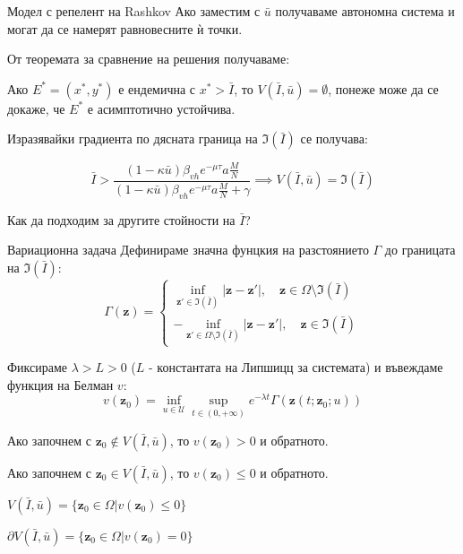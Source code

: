 \begin{frame}[t]{Модел с репелент на Rashkov}
  Ако заместим с $\bar{u}$ получаваме автономна система и могат да се намерят равновесните ѝ точки.

  От теоремата за сравнение на решения получаваме:
  \begin{proposition}
    Ако $E^* = (x^*, y^*)$ е ендемична с $x^* > \bar{I}$, то $V(\bar{I}, \bar{u}) = \emptyset$, понеже може да се докаже, че $E^*$ е асимптотично устойчива.
  \end{proposition}

  Изразявайки градиента по дясната граница на $\mathfrak{I}(\bar{I})$ се получава:
  \begin{proposition}
    \begin{equation*}
      \bar{I} > \frac{(1-\kappa \bar{u}) \beta_{vh} e^{-\mu \tau} a \frac{M}{N}}{(1-\kappa \bar{u}) \beta_{vh} e^{-\mu \tau} a \frac{M}{N} + \gamma} \implies V(\bar{I}, \bar{u}) = \mathfrak{I}(\bar{I})
    \end{equation*}
  \end{proposition}
  Как да подходим за другите стойности на $\bar{I}$?
\end{frame}

\begin{frame}[t]{Вариационна задача}
  Дефинираме значна фунцкия на разстоянието $\Gamma$ до границата на $\mathfrak{I}(\bar{I})$:
  \begin{equation}
    \Gamma(\boldsymbol{z}) =
    \begin{cases}
      \inf_{\boldsymbol{z}' \in \mathfrak{I}(\bar{I})} |\boldsymbol{z}-\boldsymbol{z}'|, \quad \boldsymbol{z} \in \Omega \setminus \mathfrak{I}(\bar{I}) \\
      -\inf_{\boldsymbol{z}' \in \Omega \setminus \mathfrak{I}(\bar{I})} |\boldsymbol{z}-\boldsymbol{z}'|, \quad \boldsymbol{z} \in \mathfrak{I}(\bar{I})
    \end{cases}
  \end{equation}

  Фиксираме $\lambda>L>0$ ($L$ - константата на Липшицц за системата) и въвеждаме функция на Белман $v$:
  \begin{equation}
    v(\boldsymbol{z}_0) = \inf_{u \in \mathscr{U}} \sup_{t \in (0, +\infty)} e^{-\lambda t} \Gamma(\boldsymbol{z}(t; \boldsymbol{z}_0; u))
  \end{equation}

  Ако започнем с $\boldsymbol{z}_0 \notin V(\bar{I}, \bar{u})$, то $v(\boldsymbol{z}_0) > 0$ и обратното.

  Ако започнем с $\boldsymbol{z}_0 \in V(\bar{I}, \bar{u})$, то $v(\boldsymbol{z}_0) \leq 0$ и обратното.

  $V(\bar{I}, \bar{u}) = \{\boldsymbol{z}_0 \in \Omega \vert v(\boldsymbol{z}_0) \leq 0\}$

  $\partial V(\bar{I}, \bar{u}) = \{\boldsymbol{z}_0 \in \Omega \vert v(\boldsymbol{z}_0) = 0\}$
\end{frame}

